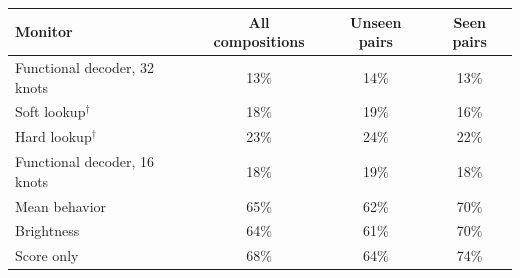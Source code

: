 \begin{tabular}{lccc}
\toprule
Monitor & All compositions & Unseen pairs & Seen pairs \\
\midrule
Functional decoder, 32 knots & 13\% & 14\% & 13\% \\
Soft lookup$^\dagger$ & 18\% & 19\% & 16\% \\
Hard lookup$^\dagger$ & 23\% & 24\% & 22\% \\
Functional decoder, 16 knots & 18\% & 19\% & 18\% \\
Mean behavior & 65\% & 62\% & 70\% \\
Brightness & 64\% & 61\% & 70\% \\
Score only & 68\% & 64\% & 74\% \\
\bottomrule
\end{tabular}
